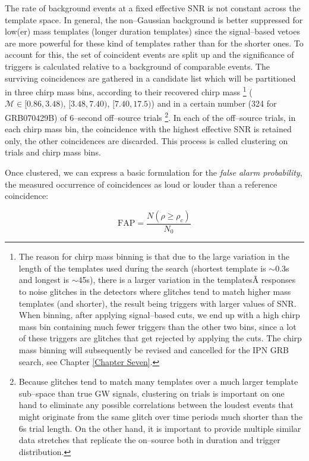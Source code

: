 The rate of background events at a fixed effective SNR is not constant across the template space. In general, the non--Gaussian background is better suppressed for low(er) mass templates (longer duration templates) since the signal--based vetoes are more powerful for these kind of templates rather than for the shorter ones. To account for this, the set of coincident events are split up and the significance of triggers is calculated relative to a background of comparable events. The surviving coincidences are gathered in a candidate list which will be partitioned in three chirp mass bins, according to their recovered chirp mass \footnote{The reason for chirp mass binning is that due to the large variation in the length of the templates used during the search (shortest template is $\sim$0.3s and longest is $\sim$45s), there is a larger variation in the templatesÃ responses to noise glitches in the detectors where glitches tend to match higher mass templates (and shorter), the result being triggers with larger values of SNR. When binning, after applying signal--based cuts, we end up with a high chirp mass bin containing much fewer triggers than the other two bins, since a lot of these triggers are glitches that get rejected by applying the cuts. The chirp mass binning will subsequently be revised and cancelled for the IPN GRB search, see Chapter \ref{Chapter Seven}.} ($\mathcal{M} \in [0.86,3.48)$, $[3.48,7.40)$, $[7.40,17.5)$) and in a certain number (324 for GRB070429B) of 6--second off--source trials \footnote{Because glitches tend to match many templates over a much larger template sub--space than true GW signals, clustering on trials is important on one hand to eliminate any possible correlations between the loudest events that might originate from the same glitch over time periods much shorter than the 6s trial length. On the other hand, it is important to provide multiple similar data stretches that replicate the on--source both in duration and trigger distribution.}. In each of the off--source trials, in each chirp mass bin, the coincidence with the highest effective SNR is retained only, the other coincidences are discarded. This process is called clustering on trials and chirp mass bins. 

Once clustered, we can express a basic formulation for the \emph{false alarm probability}, the measured occurrence of coincidences as loud or louder than a reference coincidence:

\begin{equation}
\mathrm{FAP} = \frac{N(\rho \geq \rho_c)}{N_0}
\end{equation}

